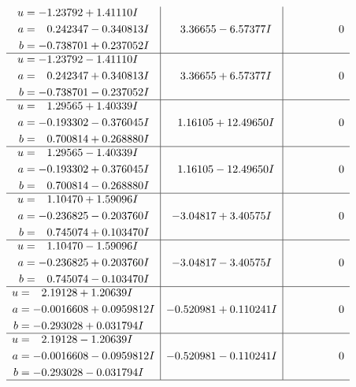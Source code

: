 \documentclass[1p]{elsarticle_modified}
\theoremstyle{definition}
\begin{document}
$$\begin{array}{c|c|c}
\begin{aligned}
u &= -1.23792 + 1.41110 I \\
a &= \phantom{-}0.242347 - 0.340813 I \\
b &= -0.738701 + 0.237052 I\end{aligned}
 & \phantom{-}3.36655 - 6.57377 I & \phantom{-0.000000 } 0 \\ \hline\begin{aligned}
u &= -1.23792 - 1.41110 I \\
a &= \phantom{-}0.242347 + 0.340813 I \\
b &= -0.738701 - 0.237052 I\end{aligned}
 & \phantom{-}3.36655 + 6.57377 I & \phantom{-0.000000 } 0 \\ \hline\begin{aligned}
u &= \phantom{-}1.29565 + 1.40339 I \\
a &= -0.193302 - 0.376045 I \\
b &= \phantom{-}0.700814 + 0.268880 I\end{aligned}
 & \phantom{-}1.16105 + 12.49650 I & \phantom{-0.000000 } 0 \\ \hline\begin{aligned}
u &= \phantom{-}1.29565 - 1.40339 I \\
a &= -0.193302 + 0.376045 I \\
b &= \phantom{-}0.700814 - 0.268880 I\end{aligned}
 & \phantom{-}1.16105 - 12.49650 I & \phantom{-0.000000 } 0 \\ \hline\begin{aligned}
u &= \phantom{-}1.10470 + 1.59096 I \\
a &= -0.236825 - 0.203760 I \\
b &= \phantom{-}0.745074 + 0.103470 I\end{aligned}
 & -3.04817 + 3.40575 I & \phantom{-0.000000 } 0 \\ \hline\begin{aligned}
u &= \phantom{-}1.10470 - 1.59096 I \\
a &= -0.236825 + 0.203760 I \\
b &= \phantom{-}0.745074 - 0.103470 I\end{aligned}
 & -3.04817 - 3.40575 I & \phantom{-0.000000 } 0 \\ \hline\begin{aligned}
u &= \phantom{-}2.19128 + 1.20639 I \\
a &= -0.0016608 + 0.0959812 I \\
b &= -0.293028 + 0.031794 I\end{aligned}
 & -0.520981 + 0.110241 I & \phantom{-0.000000 } 0 \\ \hline\begin{aligned}
u &= \phantom{-}2.19128 - 1.20639 I \\
a &= -0.0016608 - 0.0959812 I \\
b &= -0.293028 - 0.031794 I\end{aligned}
 & -0.520981 - 0.110241 I & \phantom{-0.000000 } 0\\
 \hline 
 \end{array}$$\newpage\newpage\renewcommand{\arraystretch}{1}
\end{document}
